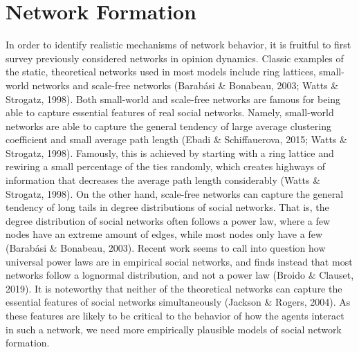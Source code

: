 \documentclass{article}
\begin{document}
\section{Network Formation}
In order to identify realistic mechanisms of network behavior, it is fruitful to first survey previously considered networks in opinion dynamics. Classic examples of the static, theoretical networks used in most models include ring lattices, small-world networks and scale-free networks (Barabási \& Bonabeau, 2003; Watts \& Strogatz, 1998). Both small-world and scale-free networks are famous for being able to capture essential features of real social networks. Namely, small-world networks are able to capture the general tendency of large average clustering coefficient and small average path length (Ebadi \& Schiffauerova, 2015; Watts \& Strogatz, 1998). Famously, this is achieved by starting with a ring lattice and rewiring a small percentage of the ties randomly, which creates highways of information that decreases the average path length considerably (Watts \& Strogatz, 1998). On the other hand, scale-free networks can capture the general tendency of long tails in degree distributions of social networks. That is, the degree distribution of social networks often follows a power law, where a few nodes have an extreme amount of edges, while most nodes only have a few (Barabási \& Bonabeau, 2003). Recent work seems to call into question how universal power laws are in empirical social networks, and finds instead that most networks follow a lognormal distribution, and not a power law (Broido \& Clauset, 2019). It is noteworthy that neither of the theoretical networks can capture the essential features of social networks simultaneously (Jackson \& Rogers, 2004). As these features are likely to be critical to the behavior of how the agents interact in such a network, we need more empirically plausible models of social network formation. 
\end{document}
